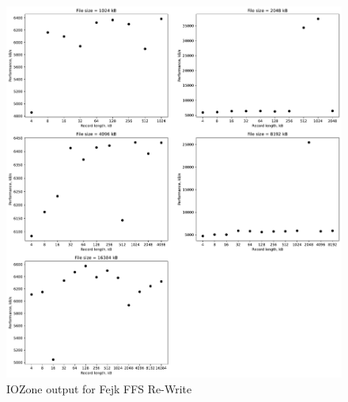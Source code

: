 \begin{figure}[!htb]
	\label{fig:app_bench_fffs_re_write}
	\begin{center}
		\includegraphics[width=1.0\textwidth]{figures/benchmarking/fake-ffs/Re-Write.pdf}
	\end{center}
	\caption{IOZone output for Fejk \gls{FFS} Re-Write}
\end{figure}

